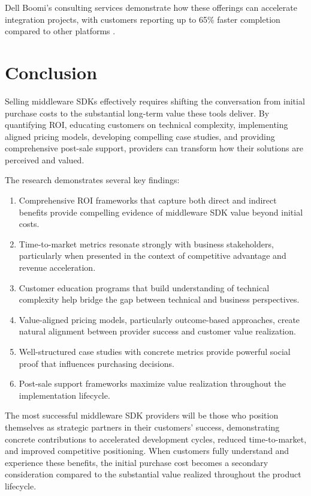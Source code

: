 \documentclass[11pt,a4paper]{article}
\begin{document}
Dell Boomi's consulting services demonstrate how these offerings can accelerate integration projects, with customers reporting up to 65\% faster completion compared to other platforms \cite{multishoring2023}.

\section{Conclusion}

Selling middleware SDKs effectively requires shifting the conversation from initial purchase costs to the substantial long-term value these tools deliver. By quantifying ROI, educating customers on technical complexity, implementing aligned pricing models, developing compelling case studies, and providing comprehensive post-sale support, providers can transform how their solutions are perceived and valued.

The research demonstrates several key findings:

\begin{enumerate}
    \item Comprehensive ROI frameworks that capture both direct and indirect benefits provide compelling evidence of middleware SDK value beyond initial costs.
    \item Time-to-market metrics resonate strongly with business stakeholders, particularly when presented in the context of competitive advantage and revenue acceleration.
    \item Customer education programs that build understanding of technical complexity help bridge the gap between technical and business perspectives.
    \item Value-aligned pricing models, particularly outcome-based approaches, create natural alignment between provider success and customer value realization.
    \item Well-structured case studies with concrete metrics provide powerful social proof that influences purchasing decisions.
    \item Post-sale support frameworks maximize value realization throughout the implementation lifecycle.
\end{enumerate}

The most successful middleware SDK providers will be those who position themselves as strategic partners in their customers' success, demonstrating concrete contributions to accelerated development cycles, reduced time-to-market, and improved competitive positioning. When customers fully understand and experience these benefits, the initial purchase cost becomes a secondary consideration compared to the substantial value realized throughout the product lifecycle.
\end{document}

